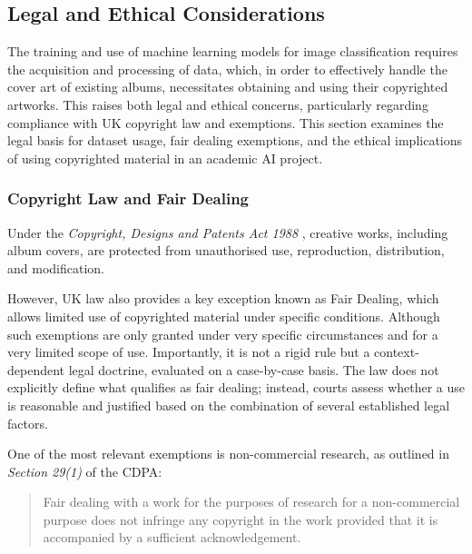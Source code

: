       \subsection{Legal and Ethical Considerations}
  
          The training and use of machine learning models for image classification requires the acquisition and processing of data, which, in order to effectively handle the cover art of existing albums, necessitates obtaining and using their copyrighted artworks. This raises both legal and ethical concerns, particularly regarding compliance with UK copyright law and exemptions. This section examines the legal basis for dataset usage, fair dealing exemptions, and the ethical implications of using copyrighted material in an academic AI project.
  
              \subsubsection{Copyright Law and Fair Dealing}
                  Under the \textit{Copyright, Designs and Patents Act 1988} \cite{cdpa1988}, creative works, including album covers, are protected from unauthorised use, reproduction, distribution, and modification.
          
                  However, UK law also provides a key exception known as Fair Dealing, which allows limited use of copyrighted material under specific conditions. Although such exemptions are only granted under very specific circumstances and for a very limited scope of use. Importantly, it is not a rigid rule but a context-dependent legal doctrine, evaluated on a case-by-case basis. The law does not explicitly define what qualifies as fair dealing; instead, courts assess whether a use is reasonable and justified based on the combination of several established legal factors.
                  
                  One of the most relevant exemptions is non-commercial research, as outlined in \textit{Section 29(1)} of the CDPA:
                  \begin{quote}
                      Fair dealing with a work for the purposes of research for a non-commercial purpose does not infringe any copyright in the work provided that it is accompanied by a sufficient acknowledgement. \cite{cdpa1988}
                  \end{quote}
  
